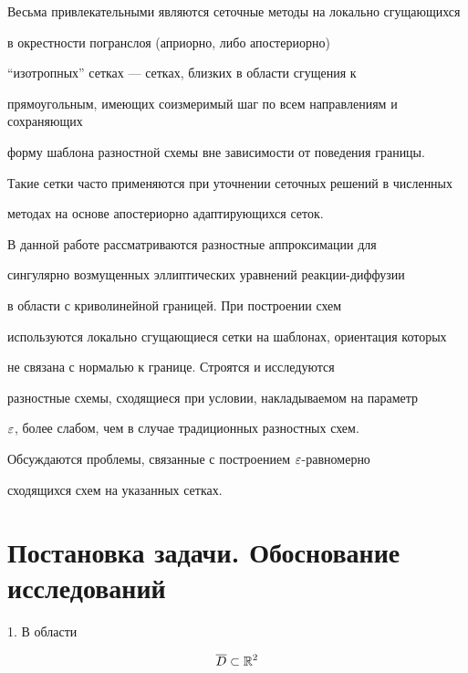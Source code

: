 Весьма привлекательными являются сеточные методы на локально сгущающихся


в окрестности погранслоя (априорно, либо апостериорно)


``изотропных'' сетках --- сетках, близких в области сгущения к


прямоугольным, имеющих соизмеримый шаг по всем направлениям и сохраняющих


форму шаблона разностной схемы вне зависимости от поведения границы.


Такие сетки часто применяются при уточнении сеточных решений в численных


методах на основе апостериорно адаптирующихся сеток.





В данной работе рассматриваются разностные аппроксимации для


сингулярно возмущенных эллиптических уравнений реакции-диффузии


в области с криволинейной границей. При построении схем


используются локально сгущающиеся сетки на шаблонах, ориентация которых


не связана с нормалью к границе. Строятся и исследуются


разностные схемы, сходящиеся при условии, накладываемом на параметр


$\varepsilon$, более слабом, чем в случае традиционных разностных схем.


Обсуждаются проблемы, связанные с построением $\varepsilon$-равномерно


сходящихся схем на указанных сетках.








\section{Постановка задачи. Обоснование исследований}


\label{section.2}





1. В области


\begin{equation}


\label{2.1}


\Db \subset \Bbb R^2


\end{equation}


